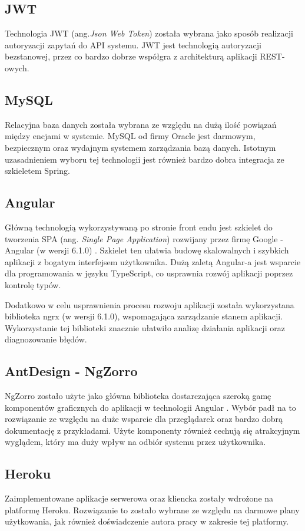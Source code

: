 \subsection{JWT}

Technologia JWT (ang.\textit{Json Web Token}) została wybrana jako sposób realizacji autoryzacji zapytań do API systemu. JWT jest technologią autoryzacji bezstanowej, przez co bardzo dobrze współgra z architekturą aplikacji REST-owych.

\subsection{MySQL} 

Relacyjna baza danych została wybrana ze względu na dużą ilość powiązań między encjami w systemie. MySQL od firmy Oracle jest darmowym, bezpiecznym oraz wydajnym systemem zarządzania bazą danych.  Istotnym uzasadnieniem wyboru tej technologii jest również bardzo dobra integracja ze szkieletem Spring.

\subsection{Angular}

Główną technologią wykorzystywaną po stronie front endu jest szkielet do tworzenia SPA (ang. \textit{Single Page Application}) rozwijany przez firmę Google - Angular (w wersji 6.1.0) \cite{angular}. Szkielet ten ułatwia budowę skalowalnych i szybkich aplikacji z bogatym interfejsem użytkownika. Dużą zaletą Angular-a jest wsparcie dla programowania w języku TypeScript, co usprawnia rozwój aplikacji poprzez kontrolę typów.

Dodatkowo w celu usprawnienia procesu rozwoju aplikacji została wykorzystana biblioteka ngrx (w wersji 6.1.0), wspomagająca zarządzanie stanem aplikacji. Wykorzystanie tej biblioteki znacznie ułatwiło analizę działania aplikacji oraz diagnozowanie błędów.


\subsection{AntDesign - NgZorro}

NgZorro zostało użyte jako główna biblioteka dostarczająca szeroką gamę komponentów graficznych do aplikacji w technologii Angular \cite{ngzorro}. Wybór padł na to rozwiązanie ze względu na duże wsparcie dla przeglądarek oraz bardzo dobrą dokumentację z przykładami. Użyte komponenty również cechują się atrakcyjnym wyglądem, który ma duży wpływ na odbiór systemu przez użytkownika.

\subsection{Heroku}

Zaimplementowane aplikacje serwerowa oraz kliencka zostały wdrożone na platformę Heroku. Rozwiązanie to zostało wybrane ze względu na darmowe plany użytkowania, jak również doświadczenie autora pracy w zakresie tej platformy. 
